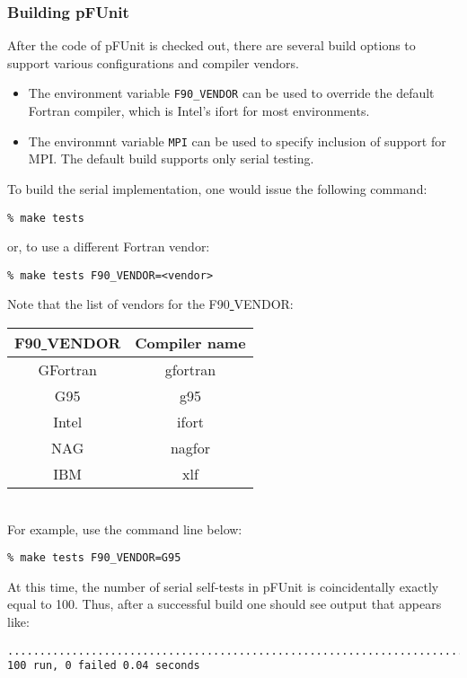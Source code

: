 \documentclass[10pt]{article}
\newcommand{\pfunit}{{\sc pFUnit }}
\begin{document}
\subsubsection{Building \pfunit}

After the code of \pfunit is checked out, there are several build
options to support various configurations and compiler vendors. 
\begin{itemize}
\item The environment variable \verb+F90_VENDOR+ can be used to
  override the default Fortran compiler, which is Intel's ifort for
  most environments.
\item The environmnt variable \verb+MPI+ can be used to specify
  inclusion of support for MPI.  The default build supports only serial testing.
\end{itemize}


To build the serial implementation, one would issue the following command:
\begin{verbatim}
% make tests
\end{verbatim}
or, to use a different Fortran vendor:
\begin{verbatim}
% make tests F90_VENDOR=<vendor>
\end{verbatim}
Note that the list of vendors for the F90\underline{ }VENDOR:\\

\begin{tabular}{||c|c||}
  \hline
  F90\underline{ }VENDOR & Compiler name \\
  \hline
  GFortran & gfortran \\
  G95         & g95 \\
  Intel         & ifort \\
  NAG  & nagfor \\
  IBM & xlf \\
  \hline
\end{tabular}\\

For example, use the command line below:
\begin{verbatim}
% make tests F90_VENDOR=G95
\end{verbatim}

At this time, the number of serial self-tests in pFUnit is
coincidentally exactly equal to 100.  Thus, after a successful build one should see output that appears like:
\begin{verbatim}
....................................................................................................
100 run, 0 failed 0.04 seconds
\end{verbatim}
\end{document}
